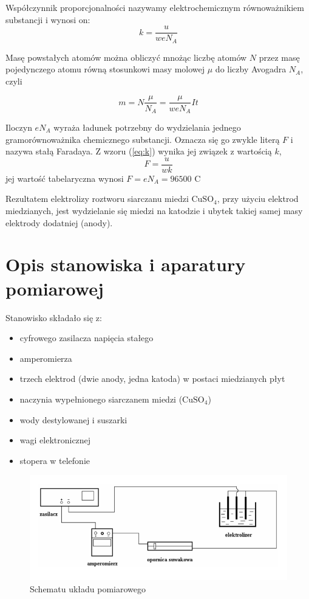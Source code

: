 \documentclass{fizykalab}
\begin{document}
Współczynnik proporcjonalności nazywamy
elektrochemicznym równoważnikiem 
substancji i
wynosi on:
\begin{equation}
    \label{eq:k}
    k = \frac{u}{w e N_A}
\end{equation}

Masę powstałych atomów można
obliczyć mnożąc liczbę atomów $N$ 
przez masę 
pojedynczego atomu równą stosunkowi masy molowej $\mu$ do liczby Avogadra $N_A$, czyli 

\begin{equation}
    m = N \frac{\mu}{N_A} = \frac{\mu}{weN_A}It
\end{equation}

Iloczyn $eN_A$
wyraża ładunek potrzebny do wydzielania jednego 
gramorównoważnika
chemicznego substancji. 
Oznacza się go zwykle literą $F$ i nazywa stałą Faradaya.
Z wzoru (\ref{eq:k}) wynika jej związek z wartością $k$,
\begin{equation}
    \label{eq:F}
    F = \frac{u}{wk}
\end{equation}
jej wartość tabelaryczna wynosi $F = e N_A = 96500$ C

Rezultatem elektrolizy roztworu siarczanu miedzi
$\text{CuSO}_4$, przy użyciu elektrod miedzianych,
jest wydzielanie się miedzi na katodzie i ubytek takiej samej masy elektrody dodatniej (anody). 

\section{Opis stanowiska i aparatury pomiarowej}
Stanowisko składało się z:
\begin{itemize}
    \item cyfrowego zasilacza napięcia stałego
    \item amperomierza
    \item trzech elektrod (dwie anody, jedna katoda) w postaci miedzianych płyt
    \item naczynia wypełnionego siarczanem miedzi ($\text{CuSO}_4$)
    \item wody destylowanej i suszarki
    \item wagi elektronicznej
    \item stopera w telefonie
\end{itemize}


\begin{figure}[H]
    \centering
    \includegraphics[width=0.75\linewidth]{aparaturka.png}
    \caption{Schematu układu pomiarowego}
\end{figure}
\end{document}
